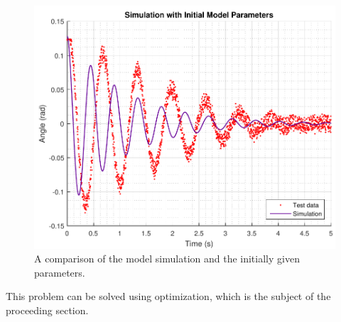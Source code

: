 \begin{figure}[H] 
	\centering
	\includegraphics[width=.7\textwidth]{figures/InitialModelParameterCompare}
	\caption{A comparison of the model simulation and the initially given parameters.}
	\label{InitialModelParameterCompare}
\end{figure}

This problem can be solved using optimization, which is the subject of the proceeding section.